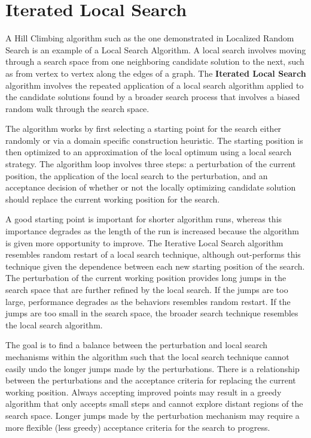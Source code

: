\section{Iterated Local Search}
A Hill Climbing algorithm such as the one demonstrated in Localized Random Search is an example of a Local Search Algorithm. A local search involves moving through a search space from one neighboring candidate solution to the next, such as from vertex to vertex along the edges of a graph. The \textbf{Iterated Local Search} algorithm involves the repeated application of a local search algorithm applied to the candidate solutions found by a broader search process that involves a biased random walk through the search space.

The algorithm works by first selecting a starting point for the search either randomly or via a domain specific construction heuristic. The starting position is then optimized to an approximation of the local optimum using a local search strategy. The algorithm loop involves three steps: a perturbation of the current position, the application of the local search to the perturbation, and an acceptance decision of whether or not the locally optimizing candidate solution should replace the current working position for the search.

A good starting point is important for shorter algorithm runs, whereas this importance degrades as the length of the run is increased because the algorithm is given more opportunity to improve. The Iterative Local Search algorithm resembles random restart of a local search technique, although out-performs this technique given the dependence between each new starting position of the search. The perturbation of the current working position provides long jumps in the search space that are further refined by the local search. If the jumps are too large, performance degrades as the behaviors resembles random restart. If the jumps are too small in the search space, the broader search technique resembles the local search algorithm.

The goal is to find a balance between the perturbation and local search mechanisms within the algorithm such that the local search technique cannot easily undo the longer jumps made by the perturbations. There is a relationship between the perturbations and the acceptance criteria for replacing the current working position. Always accepting improved points may result in a greedy algorithm that only accepts small steps and cannot explore distant regions of the search space. Longer jumps made by the perturbation mechanism may require a more flexible (less greedy) acceptance criteria for the search to progress.

